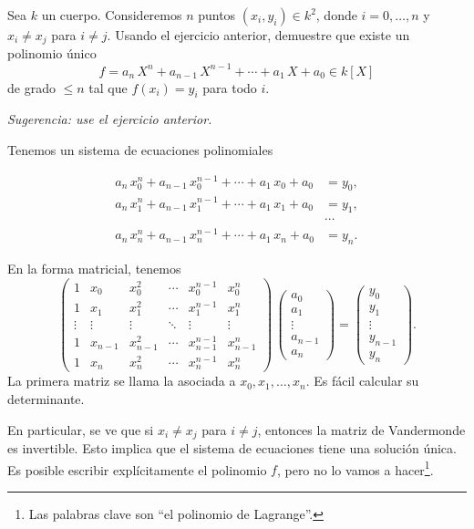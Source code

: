 \begin{ejercicio}
  Sea $k$ un cuerpo. Consideremos $n$ puntos $(x_i,y_i) \in k^2$, donde
  $i = 0,\ldots,n$ y $x_i \ne x_j$ para $i \ne j$. Usando el ejercicio anterior,
  demuestre que existe un polinomio único
  $$f = a_n\,X^n + a_{n-1}\,X^{n-1} + \cdots + a_1\,X + a_0 \in k [X]$$
  de grado $\le n$ tal que $f (x_i) = y_i$ para todo $i$.

  \noindent \emph{Sugerencia: use el ejercicio anterior.}

  \ifsolutions
  \begin{solucion}
    Tenemos un sistema de ecuaciones polinomiales

    \begin{equation}
      \label{eqn:interpolacion}
      \begin{aligned}
        a_n\,x_0^n + a_{n-1}\,x_0^{n-1} + \cdots + a_1\,x_0 + a_0 & = y_0, \\
        a_n\,x_1^n + a_{n-1}\,x_1^{n-1} + \cdots + a_1\,x_1 + a_0 & = y_1, \\
        & \cdots \\
        a_n\,x_n^n + a_{n-1}\,x_n^{n-1} + \cdots + a_1\,x_n + a_0 & = y_n.
      \end{aligned}
    \end{equation}

    En la forma matricial, tenemos
    $$\begin{pmatrix}
      1 & x_0 & x_0^2 & \cdots & x_0^{n-1} & x_0^n \\
      1 & x_1 & x_1^2 & \cdots & x_1^{n-1} & x_1^n \\
      \vdots & \vdots & \vdots & \ddots & \vdots & \vdots \\
      1 & x_{n-1} & x_{n-1}^2 & \cdots & x_{n-1}^{n-1} & x_{n-1}^n \\
      1 & x_n & x_n^2 & \cdots & x_n^{n-1} & x_n^n
    \end{pmatrix} \, \begin{pmatrix} a_0 \\ a_1 \\ \vdots \\ a_{n-1} \\ a_n \end{pmatrix} = \begin{pmatrix} y_0 \\ y_1 \\ \vdots \\ y_{n-1} \\ y_n \end{pmatrix}.$$
    La primera matriz se llama la  asociada a
    $x_0, x_1, \ldots, x_n$. Es fácil calcular su determinante.
  
    En particular, se ve que si $x_i \ne x_j$ para $i\ne j$, entonces la matriz
    de Vandermonde es invertible. Esto implica que el sistema de ecuaciones
     tiene una solución única. Es posible escribir
    explícitamente el polinomio $f$, pero no lo vamos a
    hacer\footnote{Las palabras clave son ``el polinomio de Lagrange''.}.
  \end{solucion}
  \fi
\end{ejercicio}


